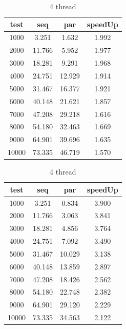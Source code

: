 \documentclass[11pt]{article}
\begin{document}
    \begin{table}
        \begin{minipage}{0.49\textwidth}
            \begin{tabular}{|c|c|c|c|}
            \hline
            test & seq & par & speedUp \\
            \hline
            1000 & 3.251 & 1.632 & 1.992 \\
            2000 & 11.766 & 5.952 & 1.977 \\
            3000 & 18.281 & 9.291 & 1.968 \\
            4000 & 24.751 & 12.929 & 1.914 \\
            5000 & 31.467 & 16.377 & 1.921 \\
            6000 & 40.148 & 21.621 & 1.857 \\
            7000 & 47.208 & 29.218 & 1.616 \\
            8000 & 54.180 & 32.463 & 1.669 \\
            9000 & 64.901 & 39.696 & 1.635 \\
            10000 & 73.335 & 46.719 & 1.570 \\
            \hline
            \end{tabular}
            \caption{2 thread}
        \end{minipage}
        \hfill
        \begin{minipage}{0.49\textwidth}
            \begin{tabular}{|c|c|c|c|}
                \hline
                test & seq & par & speedUp \\
                \hline
                1000 & 3.251 & 0.834 & 3.900 \\
                2000 & 11.766 & 3.063 & 3.841 \\
                3000 & 18.281 & 4.856 & 3.764 \\
                4000 & 24.751 & 7.092 & 3.490 \\
                5000 & 31.467 & 10.029 & 3.138 \\
                6000 & 40.148 & 13.859 & 2.897 \\
                7000 & 47.208 & 18.426 & 2.562 \\
                8000 & 54.180 & 22.748 & 2.382 \\
                9000 & 64.901 & 29.120 & 2.229 \\
                10000 & 73.335 & 34.563 & 2.122 \\
                \hline
            \end{tabular}
            \caption{4 thread}
        \end{minipage}\label{tab:table1}
    \end{table}
\end{document}
